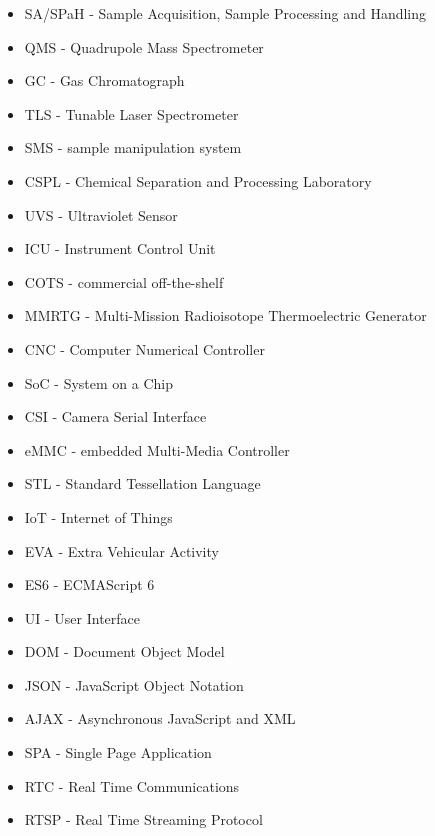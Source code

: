\begin{itemize}
\item SA/SPaH - Sample Acquisition, Sample Processing and Handling
\item QMS - Quadrupole Mass Spectrometer
\item GC - Gas Chromatograph
\item TLS - Tunable Laser Spectrometer
\item SMS - sample manipulation system
\item CSPL - Chemical Separation and Processing Laboratory
\item UVS - Ultraviolet Sensor
\item ICU - Instrument Control Unit
\item COTS - commercial off-the-shelf
\item MMRTG - Multi-Mission Radioisotope Thermoelectric Generator
\item CNC - Computer Numerical Controller
\item SoC - System on a Chip
\item CSI - Camera Serial Interface
\item eMMC - embedded Multi-Media Controller
\item STL - Standard Tessellation Language
\item IoT - Internet of Things
\item EVA - Extra Vehicular Activity
\item ES6 - ECMAScript 6
\item UI - User Interface
\item DOM - Document Object Model
\item JSON - JavaScript Object Notation
\item AJAX - Asynchronous JavaScript and XML
\item SPA - Single Page Application
\item RTC - Real Time Communications
\item RTSP - Real Time Streaming Protocol
\end{itemize}